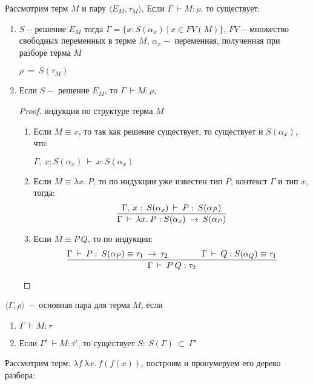 	\begin{lemma}
	Рассмотрим терм $M$ и пару $\big\langle E_M, \tau_M\big\rangle$, Если $\Gamma\:\vdash M:\rho$, то существует:
	\end{lemma}	
		\begin{enumerate}
		\item $S-$решение $E_M$ тогда $\Gamma=\{x : S(\alpha_x)\:|\:x\in FV(M)\}$, $FV-$множество свободных переменных в терме $M$, $\alpha_x-$ переменная, полученная при разборе терма $M$\par
		$\rho\:=\:S(\tau_M)$
		\item Если $S-$ решение $E_M$, то $\Gamma\:\vdash M:\rho$,
		\begin{proof}индукция по структуре терма $M$

			\begin{enumerate}
				\item Если $M\equiv x$, то так как решение существует, то существует и $S(\alpha_x)$, что: \par$\Gamma,\:x:S(\alpha_x)\:\vdash \:x:S(\alpha_x)$
				\item Если $M\equiv \lambda x.\:P$, то по индукции уже известен тип $P$, контекст $\Gamma$ и тип $x$, тогда: $${\Gamma,\:x:\:S(\alpha_x)\:\vdash \:P:\:S(\alpha_P) \over \Gamma\:\vdash \:\lambda x.\:P:S(\alpha_x)\:\rightarrow\:S(\alpha_P)}$$
				\item Если $M\equiv P\:Q$, то по индукции: $${ \Gamma\:\vdash \:P:\:S(\alpha_P)\equiv\tau_1\:\rightarrow\:\tau_2 \hspace{4em} \Gamma\:\vdash \:Q:S(\alpha_Q)\equiv\tau_1\over \Gamma\:\vdash \:P\:Q:\tau_2}$$
			\end{enumerate}					
		\end{proof}
	\end{enumerate}				
		 $\big \langle\Gamma,\rho\big\rangle\:-\:$основная пара для терма $M$, если 
		 \begin{enumerate}
			\item $\Gamma\:\vdash M:\tau$
			\item Если $\Gamma'\:\vdash M:\tau'$, то существует $S:\:S(\Gamma)\:\subset\:\Gamma'$
		 \end{enumerate}
		 \begin{example}
		\end{example}
		 	Рассмотрим терм: $\lambda f\:\lambda x.\:f(f(x))$, построим и пронумеруем его дерево разбора:\par
